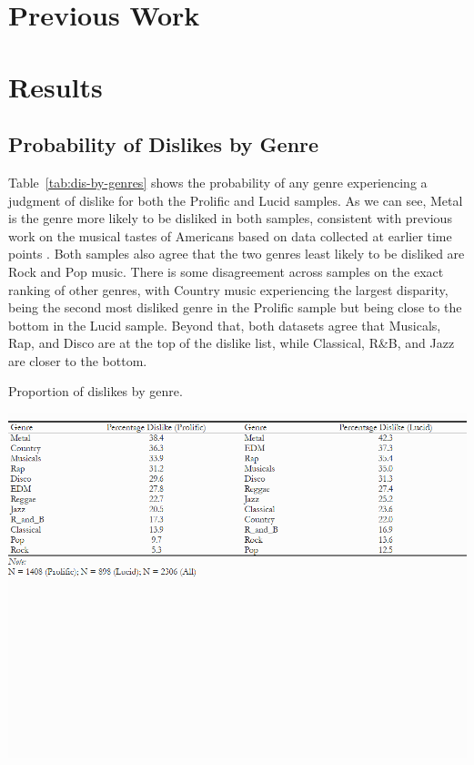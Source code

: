 \documentclass[12pt]{article}
\begin{document}
\section*{Previous Work}

\section*{Results}
\subsection*{Probability of Dislikes by Genre}
Table~\ref{tab:dis-by-genres} shows the probability of any genre experiencing a judgment of dislike for both the Prolific and Lucid samples. As we can see, Metal is the genre more likely to be disliked in both samples, consistent with previous work on the musical tastes of Americans based on data collected at earlier time points \citep{bryson1996anything-311, lizardo2015musical-8c6}. Both samples also agree that the two genres least likely to be disliked are Rock and Pop music. There is some disagreement across samples on the exact ranking of other genres, with Country music experiencing the largest disparity, being the second most disliked genre in the Prolific sample but being close to the bottom in the Lucid sample. Beyond that, both datasets agree that Musicals, Rap, and Disco are at the top of the dislike list, while Classical, R\&B, and Jazz are closer to the bottom. 

\begin{table}[ht!]
    \caption{Proportion of dislikes by genre.}
    \includegraphics[trim={0 11cm 0 0},clip, width=1.0\textwidth]{Tabs/desc-tab-dislike.png}
    \label{tab:dis-by-genres}
\end{table}
\end{document}
